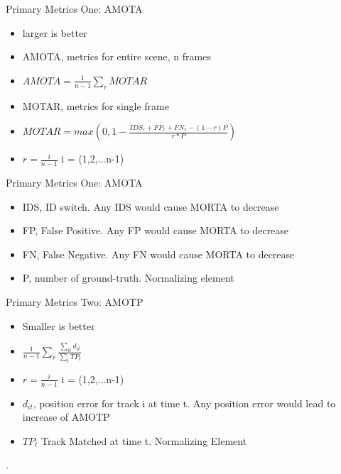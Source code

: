 \documentclass[aspectratio=169,xcolor=dvipsnames]{beamer}
\begin{document}
\begin{frame}{Primary Metrics One: AMOTA}
\begin{itemize}
\item{larger is better}
\item{AMOTA, metrics for entire scene, n frames}
\item{$AMOTA=\frac{1}{n-1} \sum_r MOTAR$}
\item{MOTAR, metrics for single frame}
\item{$MOTAR=max(0,1-\frac{IDS_r+FP_r+FN_r-(1-r)P}{r*P})$}
\item{$r=\frac{i}{n-1}$ i = (1,2,...n-1)}
\end{itemize}
\end{frame}
\begin{frame}{Primary Metrics One: AMOTA}
\begin{itemize}
\item{IDS, ID switch. Any IDS would cause MORTA to decrease}
\item{FP, False Positive. Any FP would cause MORTA to decrease}
\item{FN, False Negative. Any FN would cause MORTA to decrease}
\item{P, number of ground-truth. Normalizing element}
\end{itemize}
\end{frame}
\begin{frame}{Primary Metrics Two: AMOTP}
\begin{itemize}
\item{Smaller is better}
\item{$\frac{1}{n-1}\sum_r \frac{\sum_{it} d_{it}}{\sum_{t} TP_{t}}$}
\item{$r=\frac{i}{n-1}$ i = (1,2,...n-1)}
\item{$d_{it}$, position error for track i at time t. Any position error would lead to increase of AMOTP}
\item{$TP_{t}$ Track Matched at time t. Normalizing Element}
\end{itemize}. 
\end{frame}
\end{document}

